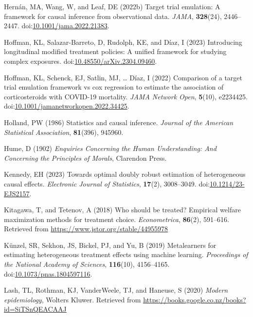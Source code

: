 \documentclass[
  singlecolumn,
  9pt]{article}
\begin{document}
\begin{CSLReferences}
Hernán, MA, Wang, W, and Leaf, DE (2022b) Target trial emulation: A
framework for causal inference from observational data. \emph{JAMA},
\textbf{328}(24), 2446--2447.
doi:\href{https://doi.org/10.1001/jama.2022.21383}{10.1001/jama.2022.21383}.

Hoffman, KL, Salazar-Barreto, D, Rudolph, KE, and Díaz, I (2023)
Introducing longitudinal modified treatment policies: A unified
framework for studying complex exposures.
doi:\href{https://doi.org/10.48550/arXiv.2304.09460}{10.48550/arXiv.2304.09460}.

Hoffman, KL, Schenck, EJ, Satlin, MJ, \ldots{} Díaz, I (2022) Comparison
of a target trial emulation framework vs cox regression to estimate the
association of corticosteroids with COVID-19 mortality. \emph{JAMA
Network Open}, \textbf{5}(10), e2234425.
doi:\href{https://doi.org/10.1001/jamanetworkopen.2022.34425}{10.1001/jamanetworkopen.2022.34425}.

Holland, PW (1986) Statistics and causal inference. \emph{Journal of the
American Statistical Association}, \textbf{81}(396), 945960.

Hume, D (1902) \emph{Enquiries Concerning the Human Understanding: And
Concerning the Principles of Morals}, Clarendon Press.

Kennedy, EH (2023) Towards optimal doubly robust estimation of
heterogeneous causal effects. \emph{Electronic Journal of Statistics},
\textbf{17}(2), 3008--3049.
doi:\href{https://doi.org/10.1214/23-EJS2157}{10.1214/23-EJS2157}.

Kitagawa, T, and Tetenov, A (2018) Who should be treated? Empirical
welfare maximization methods for treatment choice. \emph{Econometrica},
\textbf{86}(2), 591--616. Retrieved from
\url{https://www.jstor.org/stable/44955978}

Künzel, SR, Sekhon, JS, Bickel, PJ, and Yu, B (2019) Metalearners for
estimating heterogeneous treatment effects using machine learning.
\emph{Proceedings of the National Academy of Sciences},
\textbf{116}(10), 4156--4165.
doi:\href{https://doi.org/10.1073/pnas.1804597116}{10.1073/pnas.1804597116}.

Lash, TL, Rothman, KJ, VanderWeele, TJ, and Haneuse, S (2020)
\emph{Modern epidemiology}, Wolters Kluwer. Retrieved from
\url{https://books.google.co.nz/books?id=SiTSnQEACAAJ}


\end{CSLReferences}
\end{document}
